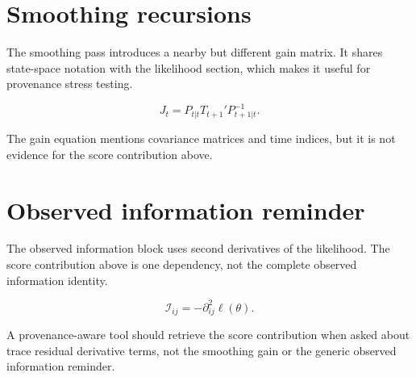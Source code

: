 \section{Smoothing recursions}
The smoothing pass introduces a nearby but different gain matrix. It shares state-space notation with the likelihood section, which makes it useful for provenance stress testing.

\begin{equation}\label{eq:longdoc-smoothing-gain}
J_t = P_{t|t}T_{t+1}'P_{t+1|t}^{-1}.
\end{equation}

The gain equation mentions covariance matrices and time indices, but it is not evidence for the score contribution above.

\section{Observed information reminder}
The observed information block uses second derivatives of the likelihood. The score contribution above is one dependency, not the complete observed information identity.

\begin{equation}\label{eq:longdoc-observed-information}
\mathcal I_{ij} = -\partial_{ij}^2 \ell(\theta).
\end{equation}

A provenance-aware tool should retrieve the score contribution when asked about trace residual derivative terms, not the smoothing gain or the generic observed information reminder.

